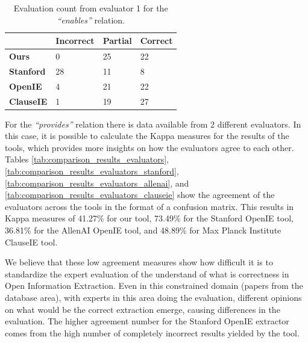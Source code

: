 \documentclass[11pt,a4paper,openright]{memoir}
\begin{document}
\begin{table}[!htbp]
  \centering
    \begin{tabular}{|m{2cm}|m{2cm}|m{2cm}|m{2cm}|}
\hline

 & \textbf{Incorrect} & \textbf{Partial} & \textbf{Correct} \\
\hline

\textbf{Ours}  & 0 & 25 & 22 \\
\hline

\textbf{Stanford}  & 28 & 11 & 8 \\
\hline

\textbf{OpenIE}  & 4 & 21 & 22 \\
\hline

\textbf{ClauseIE}  & 1 & 19 & 27 \\
\hline
    \end{tabular}
  \caption[Evaluation count from evaluator 1 for the \emph{\enquote{enables}} relation.]{Evaluation count from evaluator 1 for the \emph{\enquote{enables}} relation.}
  \label{tab:evaluation_count_enables}
\end{table}

For the \emph{\enquote{provides}} relation there is data available from 2 different evaluators. In this case, it is possible to calculate the Kappa measures for the results of the tools, which provides more insights on how the evaluators agree to each other. Tables \ref{tab:comparison_results_evaluators}, \ref{tab:comparison_results_evaluators_stanford}, \ref{tab:comparison_results_evaluators_allenai}, and \ref{tab:comparison_results_evaluators_clauseie} show the agreement of the evaluators across the tools in the format of a confusion matrix. This results in Kappa measures of 41.27\% for our tool, 73.49\% for the Stanford OpenIE tool, 36.81\% for the AllenAI OpenIE tool, and 48.89\% for Max Planck Institute ClauseIE tool.

We believe that these low agreement measures show how difficult it is to standardize the expert evaluation of the understand of what is correctness in Open Information Extraction. Even in this constrained domain (papers from the database area), with experts in this area doing the evaluation, different opinions on what would be the correct extraction emerge, causing differences in the evaluation. The higher agreement number for the Stanford OpenIE extractor comes from the high number of completely incorrect results yielded by the tool.
\end{document}
